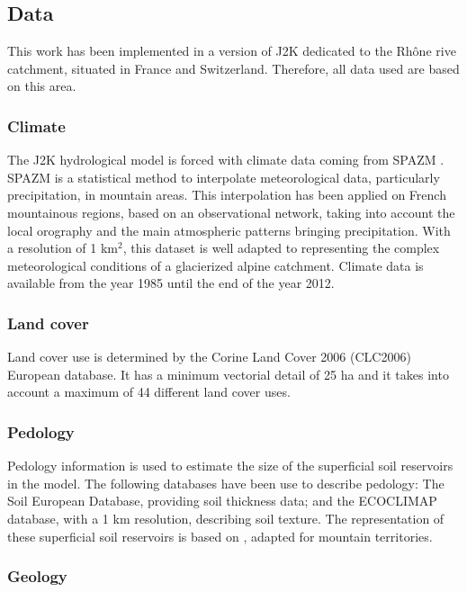 \subsection{Data}

This work has been implemented in a version of J2K dedicated to the Rhône rive catchment, situated in France and Switzerland. Therefore, all data used are based on this area. 

\subsubsection{Climate}

The J2K hydrological model is forced with climate data coming from SPAZM \citep{gottardi_statistical_2012}. SPAZM is a statistical method to interpolate meteorological data, particularly precipitation, in mountain areas. This interpolation has been applied on French mountainous regions, based on an observational network, taking into account the local orography and the main atmospheric patterns bringing precipitation. With a resolution of 1 km$^{2}$, this dataset is well adapted to representing the complex meteorological conditions of a glacierized alpine catchment. Climate data is available from the year 1985 until the end of the year 2012.

\subsubsection{Land cover}

Land cover use is determined by the Corine Land Cover 2006 (CLC2006) European database. It has a minimum vectorial detail of 25 ha and it takes into account a maximum of 44 different land cover uses. 

\subsubsection{Pedology}

Pedology information is used to estimate the size of the superficial soil reservoirs in the model. The following databases have been use to describe pedology: The Soil European Database, providing soil thickness data; and the ECOCLIMAP database, with a 1 km resolution, describing soil texture. The representation of these superficial soil reservoirs is based on \citet{sauquet_project_2015}, adapted for mountain territories. 

\subsubsection{Geology}

